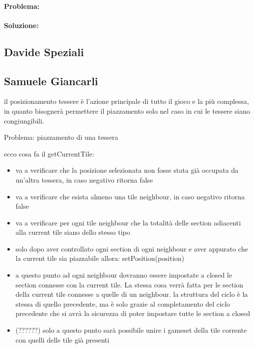 \paragraph{Problema:}

\paragraph{Soluzione:}


\subsection*{Davide Speziali}

\subsection*{Samuele Giancarli}

%
il posizionamento tessere è l'azione principale di tutto il gioco e la più complessa, in quanto bisognerà permettere il piazzamento solo nel caso in cui le tessere siano congiungibili.
%

Problema: piazzamento di una tessera



ecco cosa fa il getCurrentTile:

\begin{itemize}
\item va a verificare che la posizione selezionata non fosse stata già occupata da un’altra tessera, in caso negativo ritorna false
\item va a verificare che esista almeno una tile neighbour, in caso negativo ritorna false
\item va a verificare per ogni tile neighbour che la totalità delle section adiacenti alla current tile siano dello stesso tipo
\item solo dopo aver controllato ogni section di ogni neighbour e aver appurato che la current tile sia piazzabile allora: setPosition(position)
\item a questo punto ad ogni neighbour dovranno essere impostate a closed le section connesse con la current tile. La stessa cosa verrà fatta per le section della current tile connesse a quelle di un neighbour.
\subitem la struttura del ciclo è la stessa di quello precedente, ma è solo grazie al completamento del ciclo precedente che si avrà la sicurezza di poter impostare tutte le section a closed
\item (??????) solo a questo punto sarà possibile unire i gameset della tile corrente con quelli delle tile già presenti
\end{itemize}
